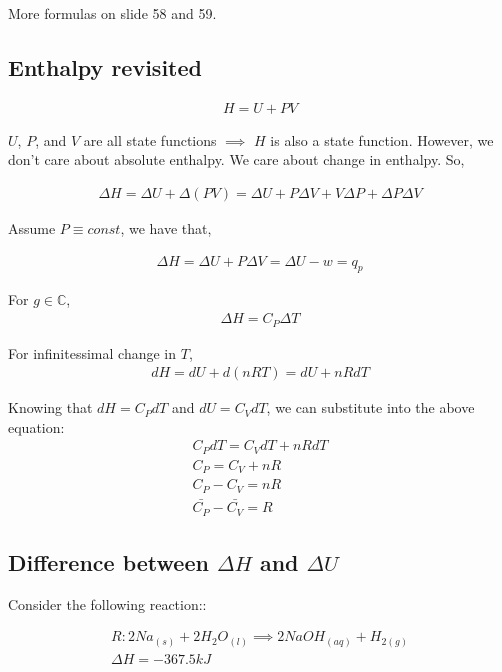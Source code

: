 \documentclass[12pt]{article}
\begin{document}
More formulas on slide 58 and 59.

\subsection*{Enthalpy revisited}

\begin{align*}
    H=U+PV
\end{align*}

$U$, $P$, and $V$ are all state functions $\implies$ $H$ is also a state function. However, we don't care about absolute enthalpy. We care about change in enthalpy. So,

\begin{align*}
    \Delta H=\Delta U+\Delta (PV)=\Delta U+P\Delta V+V\Delta P+\Delta P\Delta V
\end{align*}

Assume $P\equiv const$, we have that,

\begin{align*}
    \Delta H=\Delta U+P\Delta V=\Delta U-w=q_p
\end{align*}

For $g\in \mathbb{C}$,
\begin{align*}
    \Delta H=C_P\Delta T
\end{align*}

For infinitessimal change in $T$,
\begin{align*}
    dH=dU+d(nRT)=dU+nRdT
\end{align*}

Knowing that $dH=C_P dT$ and $dU=C_V dT$, we can substitute into the above equation:
\begin{align*}
    C_P dT=C_V dT+nRdT\\
    C_P=C_V+nR\\
    C_P-C_V=nR\\
    \bar{C_P}-\bar{C_V}=R
\end{align*}

\subsection*{Difference between $\Delta H$ and $\Delta U$}

Consider the following reaction::

\begin{align*}
    R:2Na_{(s)}+2H_2O_{(l)}\implies 2NaOH_{(aq)}+H_{2(g)}\\
    \Delta H=-367.5kJ
\end{align*}
\end{document}
